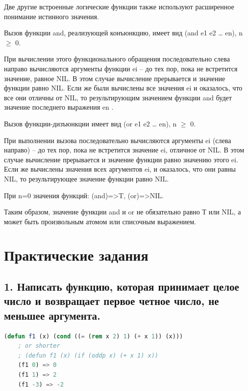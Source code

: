 \documentclass[12pt]{report}
\begin{document}
Две другие встроенные логические функции также используют расширенное понимание истинного значения. 

Вызов функции and, реализующей конъюнкцию, имеет вид (and e1 e2 … en), n $\geqslant$ 0. 

При вычислении этого функционального обращения последовательно слева направо вычисляются аргументы функции ei – до тех пор, пока не  встретится значение, равное NIL. В этом случае вычисление прерывается и значение функции равно NIL. Если же были вычислены все значения ei и  оказалось, что все они отличны от NIL, то результирующим значением функции and будет значение последнего выражения en .

Вызов функции-дизъюнкции имеет вид (or e1 e2 … en), n $\geqslant$ 0. 

При выполнении вызова последовательно вычисляются аргументы ei (слева направо) – до тех пор, пока не встретится значение ei, отличное от NIL. В этом случае вычисление прерывается и значение функции равно значению этого ei. Если же вычислены значения всех аргументов ei, и оказалось, что они равны NIL, то результирующее значение функции равно NIL.

При n=0 значения функций: (and)=>T, (or)=>NIL.

Таким образом, значение функции and и or не обязательно равно Т или NIL, а может быть произвольным атомом или списочным выражением.








	
\chapter*{Практические задания}	

\section*{1. Написать функцию, которая принимает целое число и возвращает первое четное число, не меньшее аргумента.}

\begin{lstlisting}[language=Lisp]
	(defun f1 (x) (cond ((= (rem x 2) 1) (+ x 1)) (x)))
	; or shorter
	; (defun f1 (x) (if (oddp x) (+ x 1) x))
	(f1 0) => 0
	(f1 1) => 2
	(f1 -3) => -2
\end{lstlisting}
\end{document}
